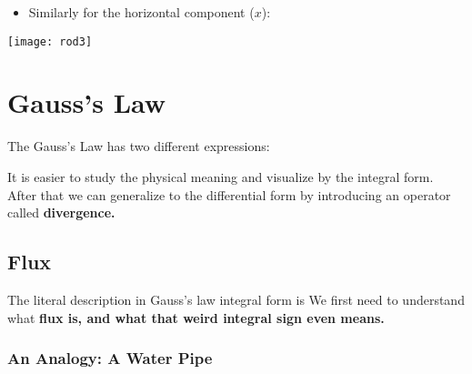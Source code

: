 \documentclass[class=article, crop=false, 12pt]{standalone}
\begin{document}
\begin{example}
\begin{minipage}{0.75\linewidth}
\begin{itemize}
\begin{itemize}
                \item Similarly for the horizontal component ($x$):
            \end{itemize}
        \end{itemize}
    \end{minipage}
    \hspace{0.02\textwidth}
    \begin{minipage}{0.15\linewidth}
        \centering
        \texttt{[image: rod3]}
    \end{minipage}
\end{example}

\linesep
\section{Gauss's Law}

The Gauss's Law has two different expressions:

It is easier to study the physical meaning and visualize by the integral form.
After that we can generalize to the differential form by introducing an operator called \bf{divergence}.

\subsection{Flux}

The literal description in Gauss's law integral form is
We first need to understand what \bf{flux} is, 
and what that weird integral sign even means.

\subsubsection{An Analogy: A Water Pipe}
\end{document}
